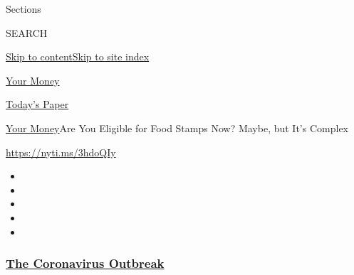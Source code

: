 Sections

SEARCH

\protect\hyperlink{site-content}{Skip to
content}\protect\hyperlink{site-index}{Skip to site index}

\href{https://www.nytimes3xbfgragh.onion/section/your-money}{Your Money}

\href{https://myaccount.nytimes3xbfgragh.onion/auth/login?response_type=cookie\&client_id=vi}{}

\href{https://www.nytimes3xbfgragh.onion/section/todayspaper}{Today's
Paper}

\href{/section/your-money}{Your Money}\textbar{}Are You Eligible for
Food Stamps Now? Maybe, but It's Complex

\url{https://nyti.ms/3hdoQIy}

\begin{itemize}
\item
\item
\item
\item
\item
\end{itemize}

\hypertarget{the-coronavirus-outbreak}{%
\subsubsection{\texorpdfstring{\href{https://www.nytimes3xbfgragh.onion/news-event/coronavirus?name=styln-coronavirus-national\&region=TOP_BANNER\&variant=undefined\&block=storyline_menu_recirc\&action=click\&pgtype=Article\&impression_id=34c72290-e386-11ea-9791-4976ace6e451}{The
Coronavirus
Outbreak}}{The Coronavirus Outbreak}}\label{the-coronavirus-outbreak}}


